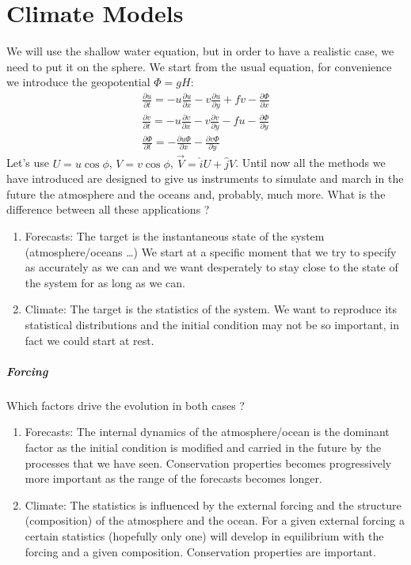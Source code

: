 
\chapter{Climate Models}
We will use the shallow water equation, but in order to have a realistic case, we need to put it on the sphere. We start from the usual equation, for convenience we introduce the geopotential $\Phi=gH$:
\begin{align}
	\frac{\partial u}{\partial t}=-u\frac{\partial u}{\partial x}-v\frac{\partial u}{\partial y}+fv-\frac{\partial \Phi}{\partial x} \\
	\frac{\partial v}{\partial t}=-u\frac{\partial v}{\partial x}-v\frac{\partial v}{\partial y}-fu-\frac{\partial \Phi}{\partial y} \\
	\frac{\partial \Phi}{\partial t}=-\frac{\partial u\Phi}{\partial x}-\frac{\partial v\Phi}{\partial y}
\end{align}
Let's use $U=u\cos\phi$, $V=v\cos\phi$, $\vec{V}=\hat{i}U+\hat{j}V$. Until now all the methods we have introduced are designed to give us instruments to simulate and march in the future the atmosphere and the oceans and, probably, much more. What is the difference between all these applications ?
\begin{enumerate}
	\item Forecasts: The target is the instantaneous state of the system (atmosphere/oceans …) We start at a specific moment that we try to specify as accurately as we can and we want desperately to stay close to the state of the system for as long as we can.
	\item Climate: The target is the statistics of the system. We want to reproduce its statistical distributions and the initial condition may not be so important, in fact we could start at rest.
\end{enumerate}
\paragraph{Forcing} Which factors drive the evolution in both cases ?
\begin{enumerate}
	\item Forecasts: The internal dynamics of the atmosphere/ocean is the dominant factor as the initial condition is modified and carried in the future by the processes that we have seen. Conservation properties becomes progressively more important as the range of the forecasts becomes longer.
	\item Climate: The statistics is influenced by the external forcing and the structure (composition) of the atmosphere and the ocean. For a given external forcing a certain statistics (hopefully only one) will develop in equilibrium with the forcing and a given composition. Conservation properties are important.
\end{enumerate}
